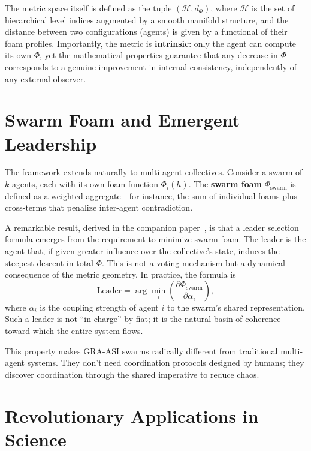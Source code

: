 \documentclass[11pt,a4paper]{article}
\begin{document}
The metric space itself is defined as the tuple $(\mathcal{H}, d_\Phi)$, where $\mathcal{H}$ is the set of hierarchical level indices augmented by a smooth manifold structure, and the distance between two configurations (agents) is given by a functional of their foam profiles. Importantly, the metric is \textbf{intrinsic}: only the agent can compute its own $\Phi$, yet the mathematical properties guarantee that any decrease in $\Phi$ corresponds to a genuine improvement in internal consistency, independently of any external observer.

\section{Swarm Foam and Emergent Leadership}

The framework extends naturally to multi-agent collectives. Consider a swarm of $k$ agents, each with its own foam function $\Phi_i(h)$. The \textbf{swarm foam} $\Phi_{\text{swarm}}$ is defined as a weighted aggregate---for instance, the sum of individual foams plus cross-terms that penalize inter-agent contradiction.

A remarkable result, derived in the companion paper~\cite{gra_doi}, is that a leader selection formula emerges from the requirement to minimize swarm foam. The leader is the agent that, if given greater influence over the collective's state, induces the steepest descent in total $\Phi$. This is not a voting mechanism but a dynamical consequence of the metric geometry. In practice, the formula is
\begin{equation}\label{eq:leader}
    \text{Leader} = \arg\min_i \left( \frac{\partial \Phi_{\text{swarm}}}{\partial \alpha_i} \right),
\end{equation}
where $\alpha_i$ is the coupling strength of agent $i$ to the swarm's shared representation. Such a leader is not ``in charge'' by fiat; it is the natural basin of coherence toward which the entire system flows.

This property makes GRA-ASI swarms radically different from traditional multi-agent systems. They don't need coordination protocols designed by humans; they discover coordination through the shared imperative to reduce chaos.

\section{Revolutionary Applications in Science}
\end{document}

